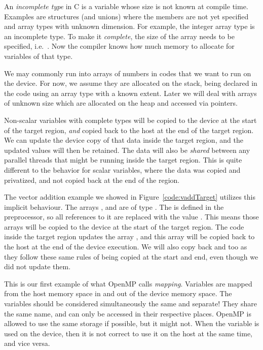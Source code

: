 An \emph{incomplete type} in C is a variable whose size is not known at compile time.
Examples are structures (and unions) where the members are not yet specified and array types with unknown dimension.
For example, the integer array type  is an incomplete type.
To make it \emph{complete}, the size of the array needs to be specified, i.e.\ .
Now the compiler knows how much memory to allocate for variables of that type.

We may commonly run into arrays of numbers in codes that we want to run on the device.
For now, we assume they are allocated on the stack, being declared in the code using an array type with a known extent.
Later we will deal with arrays of unknown size which are allocated on the heap and accessed via pointers.

Non-scalar variables with complete types will be copied to the device at the start of the target region, \emph{and} copied back to the host at the end of the target region.
We can update the device copy of that data inside the target region, and the updated values will then be retained.
The data will also be \emph{shared} between any parallel threads that might be running inside the target region.
This is quite different to the behavior for scalar variables, where the data was copied and privatized, and not copied back at the end of the region.

The vector addition example we showed in Figure~\ref{code:vaddTarget} utilizes this implicit behaviour.
The arrays ,  and  are of type .
The  is defined in the preprocessor, so all references to it are replaced with the value .
This means those arrays will be copied to the device at the start of the target region.
The code inside the target region updates the array , and this array will be copied back to the host at the end of the device execution.
We will also copy back  and  too as they follow these same rules of being copied at the start and end, even though we did not update them.

This is our first example of what OpenMP calls \emph{mapping}.
Variables are mapped from the host memory space in and out of the device memory space.
The variables should be considered simultaneously the same and separate!
They share the same name, and can only be accessed in their respective places.
OpenMP is allowed to use the same storage if possible, but it might not.
When the variable is used on the device, then it is not correct to use it on the host at the same time, and vice versa.

